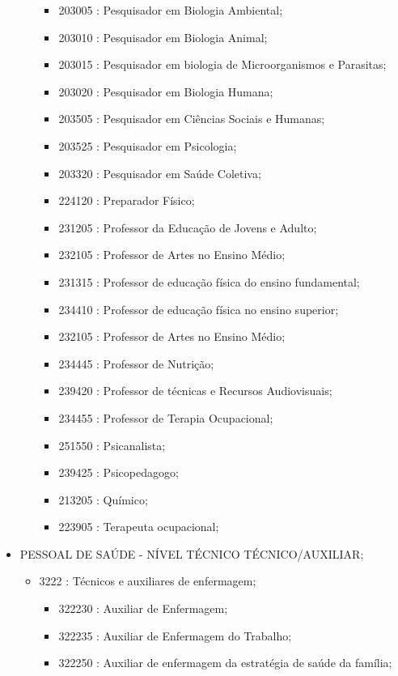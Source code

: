 \begin{itemize}
\begin{itemize}
\begin{itemize}
      \item 203005 : Pesquisador em Biologia Ambiental;
      \item 203010 : Pesquisador em Biologia Animal;
      \item 203015 : Pesquisador em biologia de Microorganismos e Parasitas;
      \item 203020 : Pesquisador em Biologia Humana;
      \item 203505 : Pesquisador em Ciências Sociais e Humanas;
      \item 203525 : Pesquisador em Psicologia;
      \item 203320 : Pesquisador em Saúde Coletiva;
      \item 224120 : Preparador Físico;
      \item 231205 : Professor da Educação de Jovens e Adulto;
      \item 232105 : Professor de Artes no Ensino Médio;
      \item 231315 : Professor de educação física do ensino fundamental;
      \item 234410 : Professor de educação física no ensino superior;
      \item 232105 : Professor de Artes no Ensino Médio;
      \item 234445 : Professor de Nutrição;
      \item 239420 : Professor de técnicas e Recursos Audiovisuais;
      \item 234455 : Professor de Terapia Ocupacional;
      \item 251550 : Psicanalista;
      \item 239425 : Psicopedagogo;
      \item 213205 : Químico;
      \item 223905 : Terapeuta ocupacional;
    \end{itemize}
  \end{itemize}
  \item PESSOAL DE SAÚDE - NÍVEL TÉCNICO TÉCNICO/AUXILIAR;
  \begin{itemize}
    \item 3222 : Técnicos e auxiliares de enfermagem;
    \begin{itemize}
      \item 322230 : Auxiliar de Enfermagem;
      \item 322235 : Auxiliar de Enfermagem do Trabalho;
      \item 322250 : Auxiliar de enfermagem da estratégia de saúde da família;

\end{itemize}
\end{itemize}
\end{itemize}
